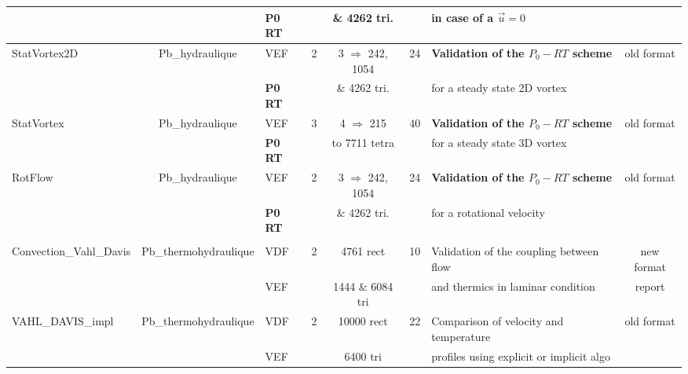 \begin{table}[H]
\begin{centering}
\begin{tabular}{lclccclc}
\rowcolor{LimeGreen!10} & & \textbf{P0 RT} & & \& 4262 tri. & & in case of a $\vec{u}=0$ & \\ \hline
\rowcolor{LimeGreen!10}StatVortex2D & Pb\_hydraulique & VEF & 2 & 3 $\Rightarrow$ 242, 1054 & 24 & \textbf{Validation of the $P_0-RT$ scheme} & old format \\ 
\rowcolor{LimeGreen!10} & & \textbf{P0 RT} & & \& 4262 tri. & & for a steady state 2D vortex &  \\ \hline
\rowcolor{LimeGreen!10}StatVortex & Pb\_hydraulique & VEF & 3 & 4 $\Rightarrow$ 215 & 40 & \textbf{Validation of the $P_0-RT$ scheme} & old format \\ 
\rowcolor{LimeGreen!10} & & \textbf{P0 RT} & & to 7711 tetra & & for a steady state 3D vortex & \\ \hline
\rowcolor{LimeGreen!10}RotFlow & Pb\_hydraulique & VEF & 2 & 3 $\Rightarrow$ 242, 1054 & 24 & \textbf{Validation of the $P_0-RT$ scheme} & old format \\ 
\rowcolor{LimeGreen!10} & & \textbf{P0 RT} & & \& 4262 tri. & & for a rotational velocity & \\ \hline
\rowcolor{ForestGreen} \multicolumn{8}{c}{\textbf{Thermal Laminar Flow}} \\
\hline
\rowcolor{ForestGreen!10}Convection\_Vahl\_Davis & Pb\_thermohydraulique & VDF & 2 & 4761 rect & 10 & Validation of the coupling between flow & new format \\ 
\rowcolor{ForestGreen!10} & & VEF & & 1444 \& 6084 tri & & and thermics in laminar condition & report \\ \hline
\rowcolor{ForestGreen!10}VAHL\_DAVIS\_impl & Pb\_thermohydraulique & VDF & 2 & 10000 rect & 22 & Comparison of velocity and temperature & old format \\ 
\rowcolor{ForestGreen!10} & & VEF & & 6400 tri & & profiles using explicit or implicit algo & \\ \hline

	\end{tabular}
\end{centering}
\end{table}


\newpage

